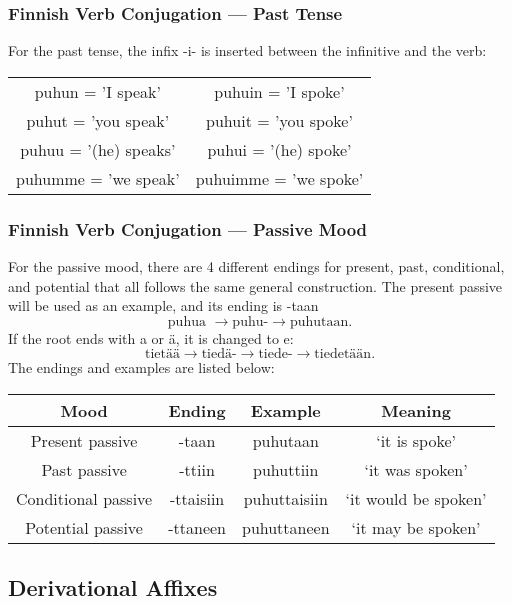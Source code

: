 \documentclass{beamer}
\begin{document}
\begin{frame}
	\frametitle{Finnish Verb Conjugation --- Past Tense}
	For the past tense, the infix -i- is inserted between the infinitive and the verb:
	\begin{center}
	\begin{tabular}{c c}
		\hline
		puhun = 'I speak' & puhuin = 'I spoke'\\
		puhut = 'you speak'& puhuit = 'you spoke'\\
		puhuu = '(he) speaks'& puhui = '(he) spoke'\\
		puhumme = 'we speak'& puhuimme = 'we spoke'\\
		\hline
	\end{tabular}
	\end{center}
\end{frame}

\begin{frame}
	\frametitle{Finnish Verb Conjugation --- Passive Mood}
	For the passive mood, there are 4 different endings for present, past, conditional, and potential that all follows the same general construction. The present passive will be used as an example, and its ending is -taan
	\[
		\text{puhua } \rightarrow \text{puhu-} \rightarrow \text{puhutaan}
	.\]
	If the root ends with a or \"a, it is changed to e:
	 \[
		\text{tiet\"a\"a} \rightarrow \text{tied\"a-} \rightarrow \text{tiede-} \rightarrow \text{tiedet\"a\"an}
	.\]
	The endings and examples are listed below:
	{\scriptsize
	\begin{center}
		\begin{tabular}{c c c c}
			\hline
			\hline
			Mood & Ending & Example & Meaning\\
			\hline
			\hline
			Present passive & -taan & puhutaan & `it is spoke'\\
			Past passive & -ttiin & puhuttiin & `it was spoken'\\
			Conditional passive & -ttaisiin & puhuttaisiin & `it would be spoken'\\
			Potential passive & -ttaneen & puhuttaneen & `it may be spoken'\\
			\hline
		\end{tabular}
	\end{center}
	}
\end{frame}


\subsection{Derivational Affixes}
\end{document}
